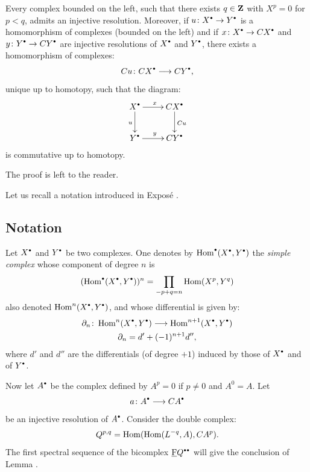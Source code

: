 \begin{proposition} \label{VIII.1.4} Every complex bounded on the left, \ie such that there exists $q\in\mathbf{Z}$ with $X^p=0$ for $p<q$, admits an injective resolution. Moreover, if $u\colon X^\boule\to Y^\boule$ is a homomorphism of complexes (bounded on the left) and if $x\colon X^\boule \to CX^\boule$ and $y\colon Y^\boule\to CY^\boule$ are injective resolutions of $X^\boule$ and $Y^\boule$, there exists a homomorphism of complexes:
\[Cu\colon CX^\boule\to CY^\boule, \]
unique up to homotopy, such that the diagram:
\[
\xymatrix{ X^\boule \ar[r]^x\ar[d]_u & CX^\boule\ar[d]^{Cu} \\
Y^\boule \ar[r]^y & CY^\boule \\
}\]
is commutative up to homotopy.
\end{proposition}

The proof is left to the reader.

Let us recall a notation introduced in Expos\'e .

\subsection*{Notation}
Let $X^\boule$ and $Y^\boule$ be two complexes. One denotes by $\Hom^\boule(X^\boule, Y^\boule)$ the \emph{simple complex} whose component of degree $n$ is
\[(\Hom^\boule(X^\boule, Y^\boule))^n=\prod_{-p+q=n}\Hom(X^p, Y^q)\]
also denoted $\Hom^n(X^\boule, Y^\boule)$, and whose differential is given by:
\begin{gather*}
\partial_n\colon \Hom^n(X^\boule, Y^\boule)\to \Hom^{n+1}(X^\boule, Y^\boule)\\
\partial_n=d'+(-1)^{n+1}d'',
\end{gather*}
where $d'$ and $d''$ are the differentials (of degree $+1$) induced by those of $X^\boule$ and of $Y^\boule$.

\setcounter{equation}{1} Now let $A^\boule$ be the complex defined by $A^p=0$ if $p\neq 0$ and $A^0=A$. Let
\[a\colon A^\boule \to CA^\boule\]
be an injective resolution of $A^\boule$. Consider the double complex:
\begin{equation} \label{eq:VIII.1.2} Q^{p, q}=\operatorname{Hom}(\operatorname{Hom}(L^{-q}, A), CA^p).
\end{equation}
The first spectral sequence of the bicomplex ${\cF}Q^{\boule\boule}$ will give the conclusion of Lemma .

